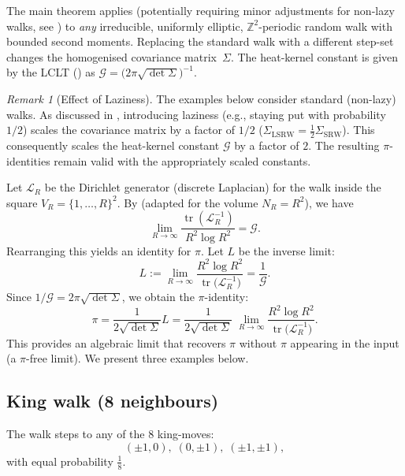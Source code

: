 \documentclass{article}
\numberwithin{equation}{section}
\theoremstyle{definition}
\theoremstyle{remark}
\newtheorem{remark}[theorem]{Remark}
\newcommand{\cG}{\mathcal{G}}
\DeclareMathOperator{\tr}{tr}
\begin{document}
The main theorem applies (potentially requiring minor adjustments for non-lazy walks, see ) to \emph{any} irreducible, uniformly elliptic,
$\mathbb{Z}^{2}$-periodic random walk with bounded second moments.
Replacing the standard walk with a different step-set changes
the homogenised covariance matrix~$\Sigma$. The heat-kernel constant is given by the LCLT () as
\(\displaystyle\cG=\bigl(2\pi\sqrt{\det\Sigma}\bigr)^{-1}\).

\begin{remark}[Effect of Laziness]\label{rem:laziness_appendix}
The examples below consider standard (non-lazy) walks. As discussed in , introducing laziness (e.g., staying put with probability $1/2$) scales the covariance matrix by a factor of $1/2$ ($\Sigma_{\text{LSRW}} = \frac{1}{2}\Sigma_{\text{SRW}}$). This consequently scales the heat-kernel constant $\cG$ by a factor of $2$. The resulting $\pi$-identities remain valid with the appropriately scaled constants.
\end{remark}


Let \( \mathcal{L}_R \) be the Dirichlet generator
(discrete Laplacian) for the walk inside the square \( V_R = \{1,\dots,R\}^2 \).
By  (adapted for the volume $N_R=R^2$), we have
\[
\lim_{R\to\infty} \frac{\tr(\mathcal{L}_R^{-1})}{R^2 \log R^2} = \cG.
\]
Rearranging this yields an identity for $\pi$. Let $L$ be the inverse limit:
\[L := \lim_{R\to\infty}\frac{R^{2}\log R^{2}}{\tr\!\bigl(\mathcal{L}_R^{-1}\bigr)} = \frac{1}{\cG}.\]
Since $1/\cG = 2\pi\sqrt{\det\Sigma}$, we obtain the $\pi$-identity:
\[\pi = \frac{1}{2\sqrt{\det\Sigma}} L = \frac{1}{2\sqrt{\det\Sigma}}\;\lim_{R\to\infty}\frac{R^{2}\log R^{2}}{\tr\!\bigl(\mathcal{L}_R^{-1}\bigr)}.\]
This provides an algebraic limit that recovers $\pi$ without $\pi$ appearing in the input (a $\pi$-free limit). We present three examples below.

\subsection{King walk (8 neighbours)}\label{app:king}

The walk steps to any of the 8 king-moves:
\[
(\pm1,0),\;(0,\pm1),\;(\pm1,\pm1),
\]
with equal probability \( \tfrac18 \).
\end{document}

